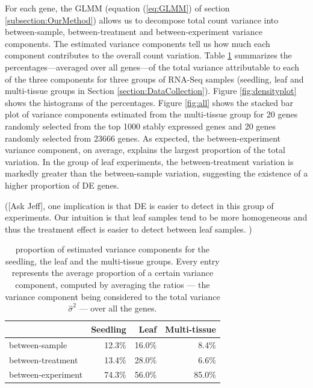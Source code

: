 \documentclass[letterpaper,12pt]{article}
\begin{document}
For each gene, the GLMM (equation (\ref{eq:GLMM}) of section
\ref{subsection:OurMethod}) allows us to decompose total count variance into
between-sample, between-treatment and between-experiment variance components.
The estimated variance components tell us how much each component contributes
to the overall count variation. Table \ref{table:percentageofvariation}
summarizes the percentages---averaged over all genes---of the total variance
attributable to each of the three components for three groups of RNA-Seq
samples (seedling, leaf and multi-tissue groups in Section \ref{section:DataCollection}). Figure \ref{fig:densityplot}
shows the histograms of the percentages. 
Figure \ref{fig:all} shows the stacked bar plot of variance components 
estimated from the multi-tissue group for 20
genes randomly selected from the top 1000 stably expressed genes 
and 20 genes randomly selected from 23666 genes. 
As expected, the between-experiment variance component, on average, explains
the largest proportion of the total variation. In the group of leaf
experiments, the between-treatment variation is markedly greater than the
between-sample variation, suggesting the existence of a higher proportion of DE genes.

([Ask Jeff], one implication is that DE is easier to detect in
this group of experiments.  
 Our intuition is that leaf samples tend
to be more homogeneous and thus the treatment effect is easier to detect
between leaf samples. ) 
 
 \begin{center} \begin{table}[h!] \centering \caption{proportion of estimated
     variance components for the seedling, the leaf and the multi-tissue groups. Every entry represents the average proportion of a certain variance component, computed by averaging the ratios --- the variance component being considered to the total variance $\hat{\sigma}^2$ --- over all the genes.} \label{table:percentageofvariation}
     \begin{tabular}{lrrr}\hline & Seedling & Leaf & Multi-tissue \\  \hline
	 between-sample     & 12.3\%   & 16.0\% & 8.4\%           \\
	 between-treatment  & 13.4\%   & 28.0\% & 6.6\%           \\
	 between-experiment & 74.3\%   & 56.0\% & 85.0\%         \\ \hline
     \end{tabular} \end{table} \end{center}
\end{document}
